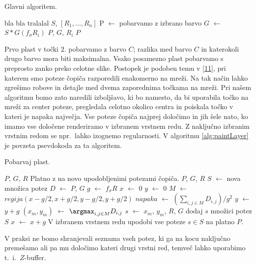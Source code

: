 \begin{algorithm}[htb]
  \caption{Glavni algoritem.}
  \label{alg:paintOsnovni}
\begin{algorithmic}[1]
\Require bla bla
\Ensure tralalal
 {$S$, $[R_1, \ldots, R_n]$}
  \State P $\leftarrow$ pobarvamo z izbrano barvo
    \State $G$ $\leftarrow$ $S \ast G(f_{\sigma} R_i)$
    \State {} {$P$, $G$, $R_i$}
  \EndFor
  \State \Return $P$
\EndFunction
\end{algorithmic}
\end{algorithm}
%
Prvo plast v točki $2.$ pobarvamo z barvo $C$; razlika med barvo $C$ in katerokoli drugo barvo mora biti maksimalna. Vsako posamezno plast pobarvamo s preprosto zanko preko celotne slike. Postopek je podoben temu v \ref{11}, pri katerem smo poteze čopiča razporedili enakomerno na mreži. Na tak način lahko zgrešimo robove in detajle med dvema zaporednima točkama na mreži. Pri našem algoritmu bomo zato naredili izboljšavo, ki bo namesto, da bi uporabila točko na mreži za center poteze, pregledala celotno okolico centra in poiskala točko v kateri je napaka največja. Vse poteze čopiča najprej določimo in jih šele nato, ko imamo vse določene renderiramo v izbranem vrstnem redu. Z naključno izbranim vrstnim redom se npr.\ lahko izognemo regularnosti. V algoritmu \ref{alg:paintLayer} je povzeta psevdokoda za ta algoritem.

\begin{algorithm}[htb]
  \caption{Pobarvaj plast.}
  \label{alg:paintLayer}
\begin{algorithmic}[1]
\Require $P$, $G$, $R$
\Ensure Platno z na novo upodobljenimi potezami čopiča.
 {$P$, $G$, $R$}
  \State $S$ $\leftarrow$ nova množica potez
  \State $D$ $\leftarrow$  {$P$, $G$}
  \State $g$ $\leftarrow$ $f_{\sigma} R$
  \State $x$ $\leftarrow$ $0$
    \State $y$ $\leftarrow$ $0$
      \State $M$ $\leftarrow$ $regija(x - g/2, x + g/2, y - g/2, y + g/2)$
      \State $napaka$ $\leftarrow$ ${(\sum_{i, j \in M} D_{i, j})}/{g^2}$
      \State $y$ $\leftarrow$ $y + g$
        \State $(x_m, y_m)$ $\leftarrow$ $\argmax_{i, j \in M} D_{i, j}$
        \State $s$ $\leftarrow$  {$x_m$, $y_m$, $R$, $G$}
        \State dodaj $s$ množici potez $S$
      \EndIf
    \EndWhile
    \State $x$ $\leftarrow$ $x + g$
  \EndWhile
  \State V izbranem vrstnem redu upodobi vse poteze $s \in S$ na platno $P$.
\EndFunction
\end{algorithmic}
\end{algorithm}
%
V praksi ne bomo shranjevali seznama vseh potez, ki ga na kocu naključno premešamo ali pa mu določimo kateri drugi vrstni red, temveč lahko uporabimo t.\ i.\ $Z$-buffer. %
